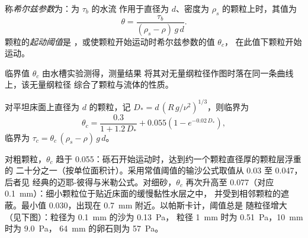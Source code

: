 \begin{definition}\label{def:b1:erosion-transport:threshold}
称\emph{希尔兹参数}为：为 $\tau_b$ 的水流
作用于直径为 $d$、密度为 $\rho_s$ 的颗粒上时，其值为
\[
  \theta = \frac{\tau_b}{(\rho_s - \rho)\,g\,d}.
\]
颗粒的\emph{起动阈值}是
，或使颗粒开始运动时希尔兹参数的值 $\theta_c$，
在此值下颗粒开始运动。
\end{definition}

临界值 $\theta_c$ 由水槽实验测得，测量结果
将其对无量纲粒径作图时落在同一条曲线上，该无量纲粒径
综合了颗粒与流体的性质。

\begin{proposition}[索尔斯比与怀特豪斯的阈值曲线]\label{prop:b1:erosion-transport:soulsby}
对平坦床面上直径为 $d$ 的颗粒，记
$D_* = d\,\left(R\,g/\nu^2\right)^{1/3}$，则临界为
\[
  \theta_c = \frac{0.3}{1 + 1.2\,D_*} + 0.055\left(1 - e^{-0.02\,D_*}\right),
\]
临界为 $\tau_c = \theta_c\,(\rho_s - \rho)\,g\,d$。
\end{proposition}
\admitted

对粗颗粒，$\theta_c$ 趋于 \num{0.055}：砾石开始运动时，达到约一个颗粒直径厚的颗粒层浮重的
二十分之一（按单位面积计）。采用常值阈值的输沙公式取值从
\num{0.03} 至 \num{0.047}，后者见
经典的迈耶-彼得与米勒公式。对细砂，$\theta_c$ 再次升高至
\num{0.077}（对应 \qty{0.1}{mm}）：细小颗粒位于贴近床面的缓慢黏性水层之中，
并受到相邻颗粒的遮蔽。最小值
\num{0.030}，出现在 \qty{0.7}{mm} 附近。以帕斯卡计，阈值总是
随粒径增大（见下图）：粒径为 \qty{0.1}{mm} 的沙为 \qty{0.13}{Pa}，
粒径 \qty{1}{mm} 时为 \qty{0.51}{Pa}，\qty{10}{mm} 时为 \qty{9.0}{Pa}，
\qty{64}{mm} 的卵石则为 \qty{57}{Pa}。

